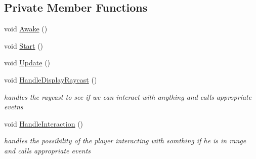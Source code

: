 \subsection*{Private Member Functions}
\begin{DoxyCompactItemize}
\item 
void \mbox{\hyperlink{class_player_aaddfa9f3b558df64f5d1d09e2b906901}{Awake}} ()
\item 
void \mbox{\hyperlink{class_player_a1a09a3ded16ac1646f6bdd4f25fe0ddd}{Start}} ()
\item 
void \mbox{\hyperlink{class_player_aace80372e18e32fe177e295fe5d93ba8}{Update}} ()
\item 
void \mbox{\hyperlink{class_player_a5f5cd09ca02aa4a73fb2df2828671596}{Handle\+Display\+Raycast}} ()
\begin{DoxyCompactList}\small\item\em handles the raycast to see if we can interact with anything and calls appropriate evetns \end{DoxyCompactList}\item 
void \mbox{\hyperlink{class_player_a377a703ca99ceaf80d62874b2585c745}{Handle\+Interaction}} ()
\begin{DoxyCompactList}\small\item\em handles the possibility of the player interacting with somthing if he is in range and calls appropriate events \end{DoxyCompactList}\end{DoxyCompactItemize}
